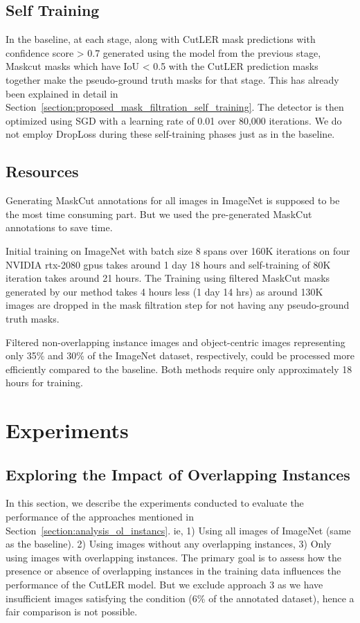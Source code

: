\subsection{Self Training}
In the baseline, at each stage, along with CutLER mask predictions with confidence score > 0.7 generated using the model from the previous stage, Maskcut masks which have IoU < 0.5 with the CutLER prediction masks together make the pseudo-ground truth masks for that stage. This has already been explained in detail in Section~\ref{section:proposed_mask_filtration_self_training}. The detector is then optimized using SGD with a learning rate of 0.01 over 80,000 iterations. We do not employ DropLoss during these self-training phases just as in the baseline.

\subsection{Resources}
Generating MaskCut annotations for all images in ImageNet is supposed to be the most time consuming part. But we used the pre-generated MaskCut annotations to save time.

Initial training on ImageNet with batch size 8 spans over 160K iterations on four NVIDIA rtx-2080 gpus takes around 1 day 18 hours and self-training of 80K iteration takes around 21 hours. The Training using filtered MaskCut masks generated by our method takes 4 hours less (1 day 14 hrs) as around 130K images are dropped in the mask filtration step for not having any pseudo-ground truth masks.


Filtered non-overlapping instance images and object-centric images representing only 35\% and 30\% of the ImageNet dataset, respectively, could be processed more efficiently compared to the baseline. Both methods require only approximately 18 hours for training.

\section{Experiments}
\subsection{Exploring the Impact of Overlapping Instances}
\label{section:overlap_experiment}
In this section, we describe the experiments conducted to evaluate the performance of the approaches mentioned in Section~\ref{section:analysis_ol_instancs}. ie, 1) Using all images of ImageNet (same as the baseline). 2) Using images without any overlapping instances, 3)  Only using images with overlapping instances. The primary goal is to assess how the presence or absence of overlapping instances in the training data influences the performance of the CutLER model. But we exclude approach 3 as we have insufficient images satisfying the condition (6\% of the annotated dataset), hence a fair comparison is not possible.


